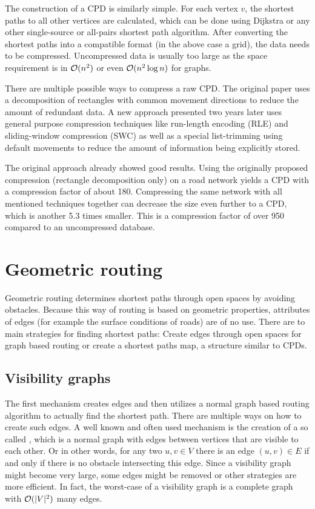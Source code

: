 			The construction of a CPD \cite{botea-cpd-2013} is similarly simple.
			For each vertex $v$, the shortest paths to all other vertices are calculated, which can be done using Dijkstra or any other single-source or all-pairs shortest path algorithm.
			After converting the shortest paths into a compatible format (in the above case a grid), the data needs to be compressed.
			Uncompressed data is usually too large as the space requirement is in $\mathcal{O}(n^2)$ or even $\mathcal{O}(n^2 \log n)$ for graphs.
			
			There are multiple possible ways to compress a raw CPD.
			The original paper uses a decomposition of rectangles with common movement directions to reduce the amount of redundant data.
			A new approach presented two years later uses general purpose compression techniques like run-length encoding (RLE) and sliding-window compression (SWC) as well as a special list-trimming using default movements to reduce the amount of information being explicitly stored.
			
			The original approach already showed good results.
			Using the originally proposed compression (rectangle decomposition only) on a road network yields a CPD with a compression factor of about 180.
			Compressing the same network with all mentioned techniques together can decrease the size even further to a CPD, which is another 5.3 times smaller.
			This is a compression factor of over 950 compared to an uncompressed database.
	
\section{Geometric routing}
\label{sec:geometric-routing}

	Geometric routing determines shortest paths through open spaces by avoiding obstacles.
	Because this way of routing is based on geometric properties, attributes of edges (for example the surface conditions of roads) are of no use.
	There are to main strategies for finding shortest paths:
	Create edges through open spaces for graph based routing or create a shortest paths map, a structure similar to CPDs.
	
	\subsection{Visibility graphs}
	\label{subsec:visibility-graph}
	
		The first mechanism creates edges and then utilizes a normal graph based routing algorithm to actually find the shortest path.
		There are multiple ways on how to create such edges.
		A well known and often used mechanism is the creation of a so called , which is a normal graph with edges between vertices that are visible to each other.
		Or in other words, for any two $u, v \in V$ there is an edge $(u, v) \in E$ if and only if there is no obstacle intersecting this edge.
		Since a visibility graph might become very large, some edges might be removed or other strategies are more efficient.
		In fact, the worst-case of a visibility graph is a complete graph with $\mathcal{O}(|V|^2)$ many edges.
		
